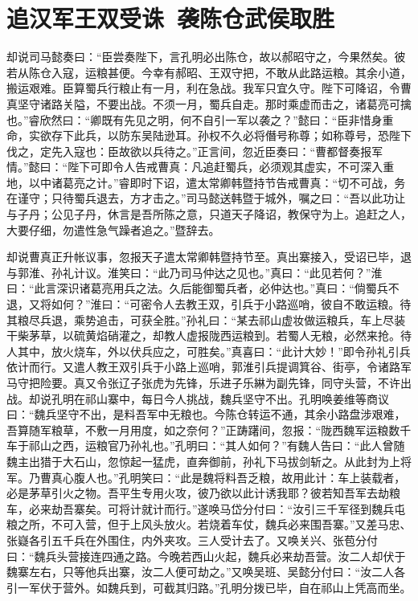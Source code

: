 \chapter{追汉军王双受诛~袭陈仓武侯取胜}

却说司马懿奏曰：“臣尝奏陛下，言孔明必出陈仓，故以郝昭守之，今果然矣。彼若从陈仓入寇，运粮甚便。今幸有郝昭、王双守把，不敢从此路运粮。其余小道，搬运艰难。臣算蜀兵行粮止有一月，利在急战。我军只宜久守。陛下可降诏，令曹真坚守诸路关隘，不要出战。不须一月，蜀兵自走。那时乘虚而击之，诸葛亮可擒也。”睿欣然曰：“卿既有先见之明，何不自引一军以袭之？”懿曰：“臣非惜身重命，实欲存下此兵，以防东吴陆逊耳。孙权不久必将僭号称尊；如称尊号，恐陛下伐之，定先入寇也：臣故欲以兵待之。”正言间，忽近臣奏曰：“曹都督奏报军情。”懿曰：“陛下可即令人告戒曹真：凡追赶蜀兵，必须观其虚实，不可深入重地，以中诸葛亮之计。”睿即时下诏，遣太常卿韩暨持节告戒曹真：“切不可战，务在谨守；只待蜀兵退去，方才击之。”司马懿送韩暨于城外，嘱之曰：“吾以此功让与子丹；公见子丹，休言是吾所陈之意，只道天子降诏，教保守为上。追赶之人，大要仔细，勿遣性急气躁者追之。”暨辞去。

却说曹真正升帐议事，忽报天子遣太常卿韩暨持节至。真出寨接入，受诏已毕，退与郭淮、孙礼计议。淮笑曰：“此乃司马仲达之见也。”真曰：“此见若何？”淮曰：“此言深识诸葛亮用兵之法。久后能御蜀兵者，必仲达也。”真曰：“倘蜀兵不退，又将如何？”淮曰：“可密令人去教王双，引兵于小路巡哨，彼自不敢运粮。待其粮尽兵退，乘势追击，可获全胜。”孙礼曰：“某去祁山虚妆做运粮兵，车上尽装干柴茅草，以硫黄焰硝灌之，却教人虚报陇西运粮到。若蜀人无粮，必然来抢。待人其中，放火烧车，外以伏兵应之，可胜矣。”真喜曰：“此计大妙！”即令孙礼引兵依计而行。又遣人教王双引兵于小路上巡哨，郭淮引兵提调箕谷、街亭，令诸路军马守把险要。真又令张辽子张虎为先锋，乐进子乐綝为副先锋，同守头营，不许出战。却说孔明在祁山寨中，每日今人挑战，魏兵坚守不出。孔明唤姜维等商议曰：“魏兵坚守不出，是料吾军中无粮也。今陈仓转运不通，其余小路盘涉艰难，吾算随军粮草，不敷一月用度，如之奈何？”正踌躇间，忽报：“陇西魏军运粮数千车于祁山之西，运粮官乃孙礼也。”孔明曰：“其人如何？”有魏人告曰：“此人曾随魏主出猎于大石山，忽惊起一猛虎，直奔御前，孙礼下马拔剑斩之。从此封为上将军。乃曹真心腹人也。”孔明笑曰：“此是魏将料吾乏粮，故用此计：车上装载者，必是茅草引火之物。吾平生专用火攻，彼乃欲以此计诱我耶？彼若知吾军去劫粮车，必来劫吾寨矣。可将计就计而行。”遂唤马岱分付曰：“汝引三千军径到魏兵屯粮之所，不可入营，但于上风头放火。若烧着车仗，魏兵必来围吾寨。”又差马忠、张嶷各引五千兵在外围住，内外夹攻。三人受计去了。又唤关兴、张苞分付曰：“魏兵头营接连四通之路。今晚若西山火起，魏兵必来劫吾营。汝二人却伏于魏寨左右，只等他兵出寨，汝二人便可劫之。”又唤吴班、吴懿分付曰：“汝二人各引一军伏于营外。如魏兵到，可截其归路。”孔明分拨已毕，自在祁山上凭高而坐。

